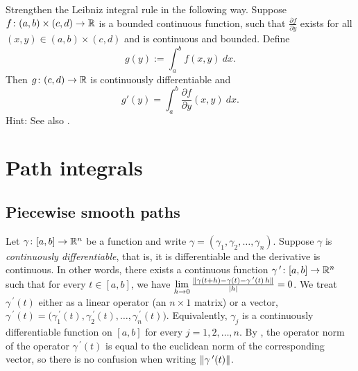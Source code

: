 \begin{exercise} \label{exercise:strongerleibniz}
Strengthen the Leibniz integral rule in the following way.
Suppose $f \colon (a,b) \times (c,d) \to {\mathbb{R}}$ is a bounded continuous function,
such that $\frac{\partial f}{\partial y}$ exists for all $(x,y) \in (a,b)
\times (c,d)$ and is continuous and bounded.  Define
\begin{equation*}
g(y) := \int_a^b f(x,y) ~dx .
\end{equation*}
Then $g \colon (c,d) \to {\mathbb{R}}$ is continuously differentiable and
\begin{equation*}
g'(y) = \int_a^b \frac{\partial f}{\partial y}(x,y) ~dx .
\end{equation*}
Hint: See also .
\end{exercise}


\sectionnewpage
\section{Path integrals}
\label{sec:pathintegral}


\subsection{Piecewise smooth paths}

Let $\gamma \colon [a,b] \to {\mathbb{R}}^n$ be a function and write
$\gamma = (\gamma_1,\gamma_2,\ldots,\gamma_n)$. 
Suppose $\gamma$ is 
\emph{continuously differentiable},
that is,
it is differentiable and the derivative is continuous.
In other words, there exists a continuous function $\gamma^{\:\prime} \colon [a,b]
\to {\mathbb{R}}^n$ such that for every $t \in [a,b]$, we have
$\lim\limits_{h \to 0}
\frac{\lVert {\gamma(t+h)-\gamma(t) - \gamma^{\:\prime}(t) \, h} \rVert}{\lvert {h} \rvert} = 0$.
We treat
$\gamma^{\:\prime}(t)$ either as a linear operator (an $n \times 1$ matrix) or
a vector,
$\gamma^{\:\prime}(t) =
\bigl( \gamma_1^{\:\prime}(t), \gamma_2^{\:\prime}(t), \ldots,
\gamma_n^{\:\prime}(t) \bigr)$.
Equivalently, 
$\gamma_j$ is a continuously differentiable function on $[a,b]$
for every $j=1,2,\ldots,n$.
By , the operator norm of
the operator $\gamma^{\:\prime}(t)$ is equal to
the euclidean norm of the corresponding vector, so there is no
confusion when writing $\lVert {\gamma^{\:\prime}(t)} \rVert$.

